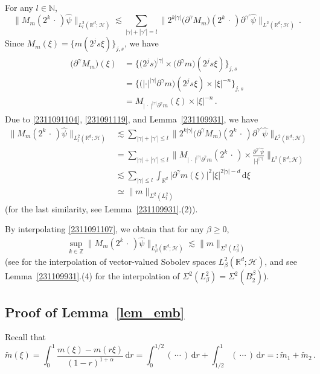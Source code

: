 \documentclass[11pt]{amsart}
\theoremstyle{plain}
\theoremstyle{definition}
\theoremstyle{remark}
\numberwithin{equation}{section}
\newcommand{\cH}{\mathcal{H}}
\newcommand{\bR}{\mathbb{R}}
\newcommand{\bZ}{\mathbb{Z}}
\newcommand{\bN}{\mathbb{N}}
\newcommand{\dd}{\,\mathrm{d}}
\newcommand{\wt}{\widetilde}
\begin{document}
For any $l\in\bN$,
$$
\|M_m(2^k\,\cdot\,)\widehat{\psi}\|_{L^2_l(\bR^d;\cH)}\lesssim \sum_{|\gamma|+|\gamma'|=l}\|2^{k|\gamma|}\big(\partial^\gamma M_m\big)(2^k\,\cdot\,)\partial^{\gamma'}\widehat{\psi}\|_{L^2(\bR^d;\cH)}\,.
$$
Since $M_m(\xi)=\{m(2^js\xi)\}_{j,s}$, we have
\begin{align}\label{231091119}
\begin{split}
\big(\partial^\gamma M_m\big)(\xi)&=\big\{\big(2^{j}s\big)^{|\gamma|}\times \big(\partial^\gamma m\big)(2^js\xi)\big\}_{j,s}\\
&=\big\{\big(|\cdot|^{|\gamma|}\partial^\gamma m\big)(2^js\xi)\times |\xi|^{-n}\big\}_{j,s}\\
&=M_{|\,\cdot\,|^{|\gamma|}\partial^\gamma m}(\xi)\times |\xi|^{-n}\,.
\end{split}
\end{align}
Due to \eqref{2311091104}, \eqref{231091119}, and Lemma~\ref{231109931}, we have
\begin{align}\label{2311091107}
\|M_m(2^k\,\cdot\,)\widehat{\psi}\|_{L^2_l(\bR^d;\cH)}&\lesssim \sum_{|\gamma|+|\gamma'|\leq l}\|2^{k|\gamma|}\big(\partial^\gamma M_m\big)(2^k\,\cdot\,)\partial^{\gamma'}\widehat{\psi}\|_{L^2(\bR^d;\cH)}\nonumber\\
&=\sum_{|\gamma|+|\gamma'|\leq l}\bigg\|M_{|\,\cdot\,|^{|\gamma|}\partial^{\gamma}m}(2^k\,\cdot\,)\times \frac{\partial^{\gamma'}\widehat{\psi}}{|\cdot|^{|\gamma|}}\bigg\|_{L^2(\bR^d;\cH)}\\
&\lesssim \sum_{|\gamma|\leq l} \int_{\bR^d}\big|\partial^{\gamma}m(\xi)\big|^2|\xi|^{2|\gamma|-d}\dd \xi\nonumber\\
&\simeq \|m\|_{\Sigma^2(L^2_l)}\nonumber
\end{align}
(for the last similarity, see Lemma~\ref{231109931}.(2)).

By interpolating \eqref{2311091107}, we obtain that for any $\beta\geq 0$, 
\begin{align*}
\sup_{k\in\bZ}\|M_m(2^k\,\cdot\,)\widehat{\psi}\|_{L^2_\beta(\bR^d;\cH)}\lesssim\|m\|_{\Sigma^2(L^2_\beta)}
\end{align*}
(see \cite[Theorem~5.6.9]{HNVW2016} for the interpolation of vector-valued Sobolev spaces $L^2_\beta(\bR^d;\cH)$, and see Lemma~\ref{231109931}.(4) for the interpolation of $\Sigma^2(L^2_\beta)=\Sigma^2(B_2^\beta)$).


\subsection{Proof of Lemma~\ref{lem_emb}}
Recall that
$$
\wt{m}(\xi)=\int_0^1\frac{m(\xi)-m(r\xi)}{(1-r)^{1+\alpha}}\dd r=\int_0^{1/2}(\,\cdots\,)\dd r+\int_{1/2}^{1}(\,\cdots\,)\dd r=:\wt{m}_1+\wt{m}_2\,.
$$
\end{document}
